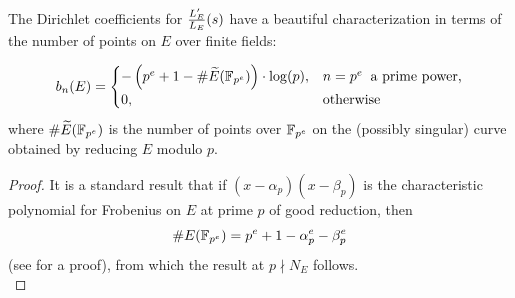 The Dirichlet coefficients for $\frac{L_E^{\prime}}{L_E}(s)$ have a beautiful characterization in terms of the number of points on $E$ over finite fields:
\begin{proposition}
\begin{equation}
b_n(E) = \begin{cases}
-\left(p^e + 1 - \#\widetilde{E}(\mathbb{F}_{p^e})\right)\cdot \log(p), & n=p^e\;\;\text{a prime power,} \\
0, & \text{otherwise} \end{cases}
\end{equation}
where $\#\widetilde{E}(\mathbb{F}_{p^e})$ is the number of points over $\mathbb{F}_{p^e}$ on the (possibly singular) curve obtained by reducing $E$ modulo $p$.
\end{proposition}

\begin{proof}
It is a standard result that if $(x-\alpha_p)(x-\beta_p)$ is the characteristic polynomial for Frobenius on $E$ at prime $p$ of good reduction, then
\begin{equation}
\#E(\mathbb{F}_{p^e}) = p^e + 1 - \alpha_p^e - \beta_p^e
\end{equation}
(see \cite[pp. 134-136]{Sil-1985} for a proof), from which the result at $p \nmid N_E$ follows. \\


\end{proof}

